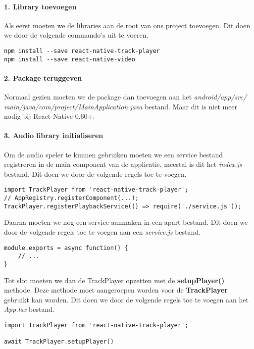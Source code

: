 \paragraph{1. Library toevoegen}
Als eerst moeten we de libraries aan de root van ons project toevoegen. Dit doen we door de 
volgende commando's uit te voeren.
\begin{verbatim}
npm install --save react-native-track-player
npm install --save react-native-video
\end{verbatim}

\paragraph{2. Package teruggeven}
Normaal gezien moeten we de package dan toevoegen aan het 
\textit{android/app/src/} \textit{main/java/com/project/MainApplication.java} bestand.
Maar dit is niet meer nodig bij React Native 0.60+.

\paragraph{3. Audio library initialiseren}
Om de audio speler te kunnen gebruiken moeten we een service bestand registreren in de main 
component van de applicatie, meestal is dit het \textit{index.js} bestand. Dit doen we door de volgende
regels toe te voegen.
\begin{verbatim}
import TrackPlayer from 'react-native-track-player';
// AppRegistry.registerComponent(...);
TrackPlayer.registerPlaybackService(() => require('./service.js'));
\end{verbatim}
Daarna moeten we nog een service aanmaken in een apart bestand. Dit doen we door de volgende regels
toe te voegen aan een \textit{service.js} bestand. 
\begin{verbatim}
module.exports = async function() {
    // ...
}
\end{verbatim}
Tot slot moeten we dan de TrackPlayer opzetten met de \textbf{setupPlayer()} methode. Deze methode
moet aangeroepen worden voor de \textbf{TrackPlayer} gebruikt kan worden. Dit doen we door de volgende
regels toe te voegen aan het \textit{App.tsx} bestand.
\begin{verbatim}
import TrackPlayer from 'react-native-track-player';

await TrackPlayer.setupPlayer()
\end{verbatim}

